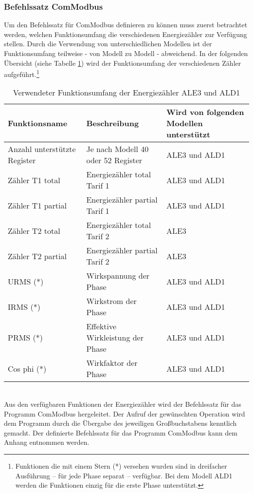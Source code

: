 \documentclass[Bachelorarbeit.tex]{subfiles}
\begin{document}
\subsubsection*{Befehlssatz ComModbus}
Um den Befehlssatz für ComModbus definieren zu können muss zuerst betrachtet werden, welchen Funktionsumfang die verschiedenen Energiezähler zur Verfügung stellen. Durch die 
Verwendung von unterschiedlichen Modellen ist der 
Funktionsumfang teilweise - von Modell zu Modell - abweichend. In der folgenden Übersicht (siehe 
Tabelle \ref{tab:funkion_zaehler}) wird der Funktionsumfang der verschiedenen Zähler aufgeführt.\footnote{Funktionen die mit 
einem Stern (*) versehen wurden sind in dreifacher Ausführung – für jede Phase separat – verfügbar. Bei dem Modell ALD1 werden die Funktionen einzig für die erste Phase unterstützt.} 


\begin{table} [h]
\begin{tabular}{|m{25ex}|m{25ex}|m{25ex}|}
\hline \textbf{Funktionsname} &  \textbf{Beschreibung} & \textbf{Wird von folgenden Modellen unterstützt} \\ 
\hline 
\rule[-0ex]{0pt}{2.5ex}Anzahl unterstützte Register & Je nach Modell 40 oder 52 Register & \acs{ALE3} und \acs{ALD1} \\ 
\hline 
\rule[-0ex]{0pt}{2.5ex}Zähler T1 total & Energiezähler total Tarif 1 & \acs{ALE3} und \acs{ALD1} \\ 
\hline Zähler T1 partial  & Energiezähler partial Tarif 1 & \acs{ALE3} und \acs{ALD1} \\ 
\hline Zähler T2 total  & Energiezähler total Tarif 2  & \acs{ALE3} \\ 
\hline Zähler T2 partial & Energiezähler partial Tarif 2 & \acs{ALE3} \\ 
\hline URMS (*) & Wirkspannung der Phase & \acs{ALE3} und \acs{ALD1}  \\ 
\hline IRMS (*) & Wirkstrom der Phase & \acs{ALE3} und \acs{ALD1}  \\ 
\hline PRMS (*) & Effektive Wirkleistung der Phase & \acs{ALE3} und \acs{ALD1}  \\ 
\hline Cos phi (*) & Wirkfaktor der Phase & \acs{ALE3} und \acs{ALD1}  \\ 
\hline 
\end{tabular} 
\caption{Verwendeter Funktionsumfang der Energiezähler ALE3 und ALD1 \parencites[vgl.][]{datenblatt_ald1}[und][]{datenblatt_ale3}}
\label{tab:funkion_zaehler}
\end{table}
\mbox{}\\
Aus den verfügbaren Funktionen der Energiezähler wird der Befehlssatz für das 
Programm ComModbus hergeleitet. Der Aufruf der gewünschten Operation wird dem Programm durch die Übergabe des jeweiligen Großbuchstabens kenntlich 
gemacht. Der definierte Befehlssatz für das Programm ComModbus kann dem Anhang entnommen werden. 
\end{document}
